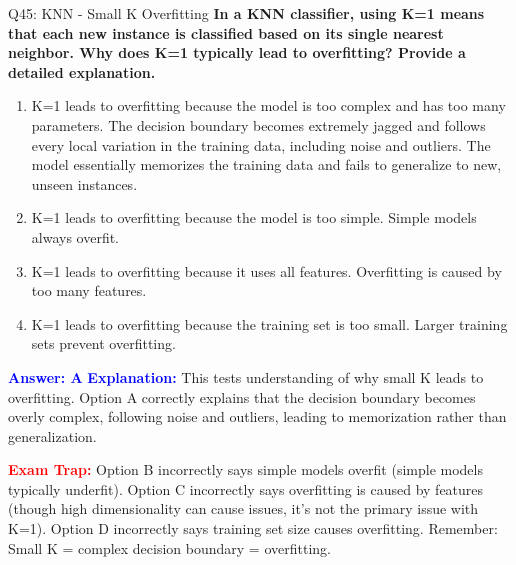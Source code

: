 \documentclass[8pt]{beamer}
\begin{document}
	\begin{frame}{Q45: KNN - Small K Overfitting}
		\fontsize{6.5}{7.5}\selectfont
		\textbf{In a KNN classifier, using K=1 means that each new instance is classified based on its single nearest neighbor. Why does K=1 typically lead to overfitting? Provide a detailed explanation.}
		
		\begin{enumerate}
			\item K=1 leads to overfitting because the model is too complex and has too many parameters. The decision boundary becomes extremely jagged and follows every local variation in the training data, including noise and outliers. The model essentially memorizes the training data and fails to generalize to new, unseen instances.
			\item K=1 leads to overfitting because the model is too simple. Simple models always overfit.
			\item K=1 leads to overfitting because it uses all features. Overfitting is caused by too many features.
			\item K=1 leads to overfitting because the training set is too small. Larger training sets prevent overfitting.
		\end{enumerate}
		
		\vspace{0.1cm}
		\textcolor{blue}{\textbf{Answer: A}}
		\vspace{0.1cm}
		\textcolor{blue}{\textbf{Explanation:}} This tests understanding of why small K leads to overfitting. Option A correctly explains that the decision boundary becomes overly complex, following noise and outliers, leading to memorization rather than generalization.
		
		\textcolor{red}{\textbf{Exam Trap:}} Option B incorrectly says simple models overfit (simple models typically underfit). Option C incorrectly says overfitting is caused by features (though high dimensionality can cause issues, it's not the primary issue with K=1). Option D incorrectly says training set size causes overfitting. Remember: Small K = complex decision boundary = overfitting.
	\end{frame}
	
\end{document}
